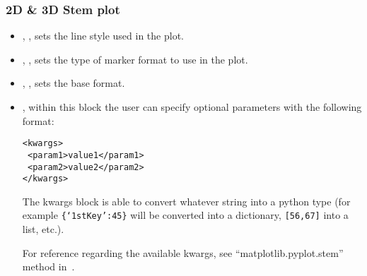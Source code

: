 \subsubsection{2D \& 3D Stem plot}
  \begin{itemize}
  \item {}, , sets the line
  style used in the plot.
  \item {}, , sets the type of
  marker format to use in the plot.
  \item {}, , sets the base
  format.
  \item {}, within this block the user can specify optional
  parameters with the following format:

\begin{lstlisting}[style=XML]
<kwargs>
 <param1>value1</param1>
 <param2>value2</param2>
</kwargs>
\end{lstlisting}

  The kwargs block is able to convert whatever string into a python type (for
  example  \texttt{\{`1stKey':45\}} will
  be converted into a dictionary, 
   \texttt{[56,67]}  into a list, etc.).

  For reference regarding the available kwargs, see ``matplotlib.pyplot.stem''
  method in~\cite{MatPlotLib}.
    \end{itemize}

